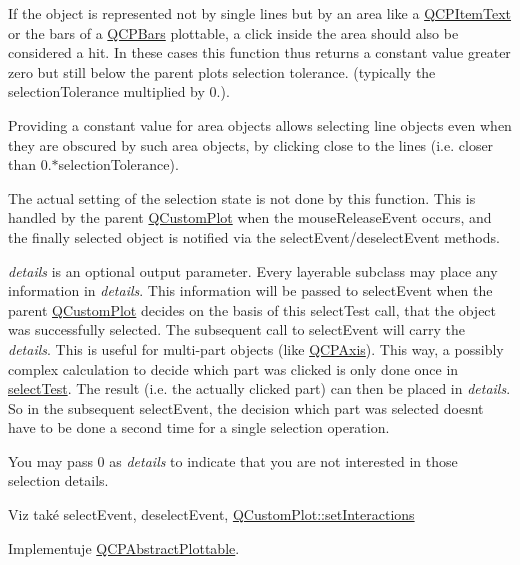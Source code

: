 If the object is represented not by single lines but by an area like a \hyperlink{classQCPItemText}{Q\+C\+P\+Item\+Text} or the bars of a \hyperlink{classQCPBars}{Q\+C\+P\+Bars} plottable, a click inside the area should also be considered a hit. In these cases this function thus returns a constant value greater zero but still below the parent plot\textquotesingle{}s selection tolerance. (typically the selection\+Tolerance multiplied by 0.).

Providing a constant value for area objects allows selecting line objects even when they are obscured by such area objects, by clicking close to the lines (i.\+e. closer than 0.$\ast$selection\+Tolerance).

The actual setting of the selection state is not done by this function. This is handled by the parent \hyperlink{classQCustomPlot}{Q\+Custom\+Plot} when the mouse\+Release\+Event occurs, and the finally selected object is notified via the select\+Event/deselect\+Event methods.

{\itshape details} is an optional output parameter. Every layerable subclass may place any information in {\itshape details}. This information will be passed to select\+Event when the parent \hyperlink{classQCustomPlot}{Q\+Custom\+Plot} decides on the basis of this select\+Test call, that the object was successfully selected. The subsequent call to select\+Event will carry the {\itshape details}. This is useful for multi-\/part objects (like \hyperlink{classQCPAxis}{Q\+C\+P\+Axis}). This way, a possibly complex calculation to decide which part was clicked is only done once in \hyperlink{classQCPStatisticalBox_a7d3ac843dc48a085740fdfc4319a89cc}{select\+Test}. The result (i.\+e. the actually clicked part) can then be placed in {\itshape details}. So in the subsequent select\+Event, the decision which part was selected doesn\textquotesingle{}t have to be done a second time for a single selection operation.

You may pass 0 as {\itshape details} to indicate that you are not interested in those selection details.

\begin{DoxySeeAlso}{Viz také}
select\+Event, deselect\+Event, \hyperlink{classQCustomPlot_a5ee1e2f6ae27419deca53e75907c27e5}{Q\+Custom\+Plot\+::set\+Interactions} 
\end{DoxySeeAlso}


Implementuje \hyperlink{classQCPAbstractPlottable_a1fc81aa273e9e8db84c1056bc0181fdb}{Q\+C\+P\+Abstract\+Plottable}.

